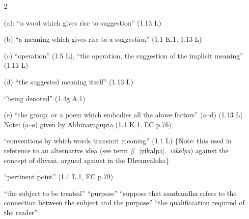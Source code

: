 \documentclass[10pt]{article}
\begin{document}
\begin{multicols}{2}
\begin{enumerate}[
			leftmargin=0em,
			rightmargin=0em,
		]
		 (a): ``a word which gives rise to suggestion'' (1.13 L)

		 (b) ``a meaning which gives rise to a suggestion'' (1.1 K.1, 1.13 L)%

		 (c) ``operation'' (1.5 L),
		``the operation, the suggestion of the implicit meaning'' (1.13 L)

		 (d) ``the suggested meaning itself'' (1.13 L)

		 ``being denoted'' (1.4g A.1)

		 (e) ``the group; or a poem which embodies all the above factors'' (a--d) (1.13 L) Note: (a--e) given by Abhinavagupta (1.1 K.1, EC p.76)

		  ``conventions by which words transmit meaning'' (1.1 L)
		\{Note: this used in reference to an alternative idea (see term \#~\ref{vikalpa}.\ \textit{vikalpa}) against the concept of dhvani, argued against in the Dhvanyāloka\}

		 ``pertinent point'' (1.1 L.1, EC p.79)
		\begin{enumerate}
			 ``the subject to be treated''
			 ``purpose''
			 ``suppose that sambandha refers to the connection between the subject and the purpose''
			 ``the qualificcation required of the reader''
		\end{enumerate}


\end{enumerate}
\end{multicols}
\end{document}
